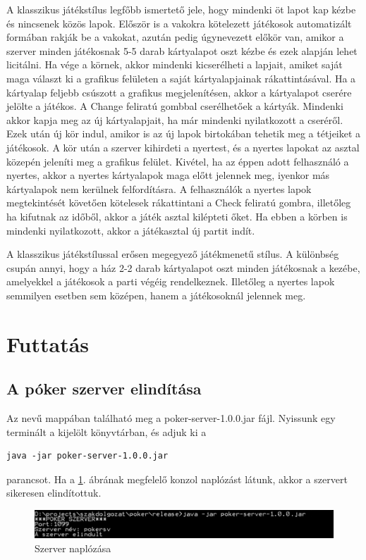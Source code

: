 A klasszikus játékstílus legfőbb ismertető jele, hogy mindenki öt lapot kap kézbe és nincsenek közös lapok. Először is a vakokra kötelezett játékosok automatizált formában rakják be a vakokat, azután pedig úgynevezett előkör van, amikor a szerver minden játékosnak 5-5 darab kártyalapot oszt kézbe és ezek alapján lehet licitálni. Ha vége a körnek, akkor mindenki kicserélheti a lapjait, amiket saját maga választ ki a grafikus felületen a saját kártyalapjainak rákattintásával. Ha a kártyalap feljebb csúszott a grafikus megjelenítésen, akkor a kártyalapot cserére jelölte a játékos. A Change feliratú gombbal cserélhetőek a kártyák. Mindenki akkor kapja meg az új kártyalapjait, ha már mindenki nyilatkozott a cseréről. Ezek után új kör indul, amikor is az új lapok birtokában tehetik meg a tétjeiket a játékosok. A kör után a szerver kihirdeti a nyertest, és a nyertes lapokat az asztal közepén jeleníti meg a grafikus felület. Kivétel, ha az éppen adott felhasználó a nyertes, akkor a nyertes kártyalapok maga előtt jelennek meg, iyenkor más kártyalapok nem kerülnek felfordításra. A felhasználók a nyertes lapok megtekintését követően kötelesek rákattintani a Check feliratú gombra, illetőleg ha kifutnak az időből, akkor a játék asztal kilépteti őket. Ha ebben a körben is mindenki nyilatkozott, akkor a játékasztal új partit indít.

A klasszikus játékstílussal erősen megegyező játékmenetű stílus. A különbség csupán annyi, hogy a ház 2-2 darab kártyalapot oszt minden játékosnak a kezébe, amelyekkel a játékosok a parti végéig rendelkeznek. Illetőleg a nyertes lapok semmilyen esetben sem középen, hanem a játékosoknál jelennek meg.

\section{Futtatás}

\subsection{A póker szerver elindítása}
Az  nevű mappában található meg  a poker-server-1.0.0.jar fájl. Nyissunk egy terminált a kijelölt könyvtárban, és adjuk ki a
 \begin{verbatim}
java -jar poker-server-1.0.0.jar
\end{verbatim}
parancsot. Ha a \ref{fig:server_started}. ábrának megfelelő konzol naplózást látunk, akkor a szervert sikeresen elindítottuk.
\begin{figure}[h!]
  \caption{Szerver naplózása}
  \label{fig:server_started}
  \centering
    \includegraphics[width=\linewidth]{user-documentation/images/server_started.jpg}
\end{figure}

